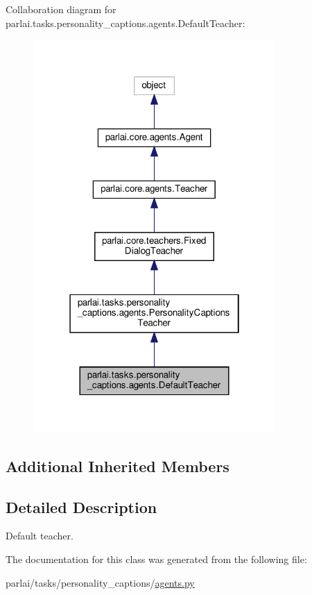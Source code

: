 Collaboration diagram for parlai.\+tasks.\+personality\+\_\+captions.\+agents.\+Default\+Teacher\+:
\nopagebreak
\begin{figure}[H]
\begin{center}
\leavevmode
\includegraphics[width=262pt]{classparlai_1_1tasks_1_1personality__captions_1_1agents_1_1DefaultTeacher__coll__graph}
\end{center}
\end{figure}
\subsection*{Additional Inherited Members}


\subsection{Detailed Description}
\begin{DoxyVerb}Default teacher.
\end{DoxyVerb}
 

The documentation for this class was generated from the following file\+:\begin{DoxyCompactItemize}
\item 
parlai/tasks/personality\+\_\+captions/\hyperlink{parlai_2tasks_2personality__captions_2agents_8py}{agents.\+py}\end{DoxyCompactItemize}
